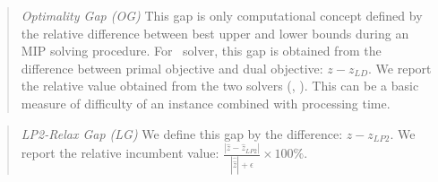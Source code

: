 \begin{quote}
	\noindent\textit{Optimality Gap (OG)} This gap is only computational concept defined by the relative difference between best upper and lower bounds during an MIP solving procedure. For \dsp\ solver, this gap is obtained from the difference between primal objective and dual objective: $z-z_{LD}$. We report the relative value obtained from the two solvers (\cplex, \dsp). This can be a basic measure of difficulty of an instance combined with processing time.
\end{quote}

\begin{quote}
	\noindent\textit{LP2-Relax Gap (LG)} We define this gap by the difference: $z-z_{LP2}$. We report the relative incumbent value: $\frac{|\hat{z}-\hat{z}_{LP2}|}{|\hat{\hat{z}}|+\epsilon}\times 100\%$.
	
\end{quote}

%

